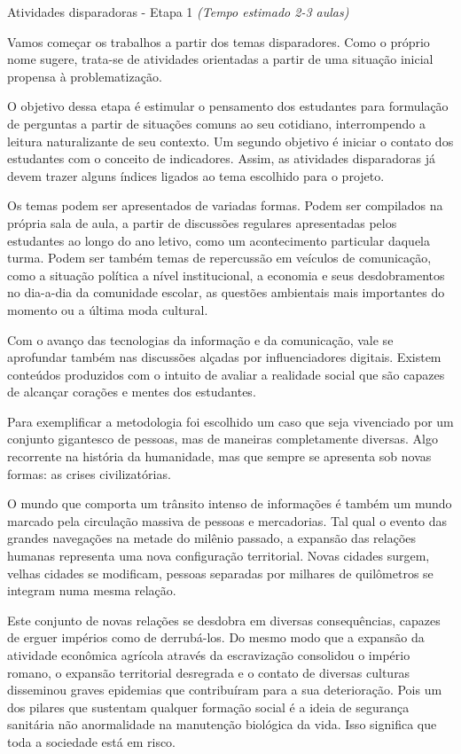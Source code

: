 \begin{paginatexto}{Atividades disparadoras - Etapa 1}
\textit{(Tempo estimado 2-3 aulas)}

Vamos começar os trabalhos a partir dos temas disparadores. Como o próprio nome sugere, trata-se de atividades orientadas a partir de uma situação inicial propensa à problematização.

O objetivo dessa etapa é estimular o pensamento dos estudantes para formulação de perguntas a partir de situações comuns ao seu cotidiano, interrompendo a leitura naturalizante de seu contexto. Um segundo objetivo é iniciar o contato dos estudantes com o conceito de indicadores. Assim, as atividades disparadoras já devem trazer alguns índices ligados ao tema escolhido para o projeto. 

Os temas podem ser apresentados de variadas formas. Podem ser compilados na própria sala de aula, a partir de discussões regulares apresentadas pelos estudantes ao longo do ano letivo, como um acontecimento particular daquela turma. Podem ser também temas de repercussão em veículos de comunicação, como a situação política a nível institucional, a economia e seus desdobramentos no dia-a-dia da comunidade escolar, as questões ambientais mais importantes do momento ou a última moda cultural.

Com o avanço das tecnologias da informação e da comunicação, vale se aprofundar também nas discussões alçadas por influenciadores digitais. Existem conteúdos produzidos com o intuito de avaliar a realidade social que são capazes de alcançar corações e mentes dos estudantes.

Para exemplificar a metodologia foi escolhido um caso que seja vivenciado por um conjunto gigantesco de pessoas, mas de maneiras completamente diversas. Algo recorrente na história da humanidade, mas que sempre se apresenta sob novas formas: as crises civilizatórias.

O mundo que comporta um trânsito intenso de informações é também um mundo marcado pela circulação massiva de pessoas e mercadorias. Tal qual o evento das grandes navegações na metade do milênio passado, a expansão das relações humanas representa uma nova configuração territorial. Novas cidades surgem, velhas cidades se modificam, pessoas separadas por milhares de quilômetros se integram numa mesma relação.

Este conjunto de novas relações se desdobra em diversas consequências, capazes de erguer impérios como de derrubá-los. Do mesmo modo que a expansão da atividade econômica agrícola através da escravização consolidou o império romano, o expansão territorial desregrada e o contato de diversas culturas disseminou graves epidemias que contribuíram para a sua deterioração. Pois um dos pilares que sustentam qualquer formação social é a ideia de segurança sanitária não anormalidade na manutenção biológica da vida. Isso significa que toda a sociedade está em risco.


\end{paginatexto}

